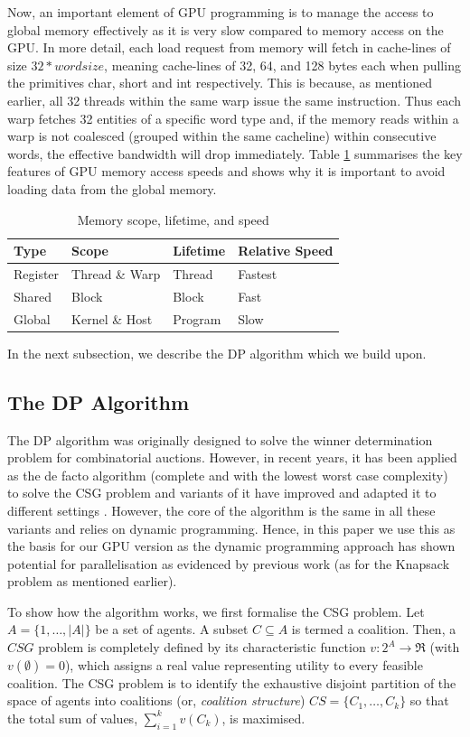 \documentclass{llncs}
\begin{document}
Now, an important element of GPU programming is to manage the access to global memory effectively as it is very slow compared to memory access on the GPU. In more detail,  each load request from memory will fetch in cache-lines of size $32*wordsize$, meaning cache-lines of 32, 64, and 128 bytes each when pulling the primitives char, short and int respectively. This is because, as mentioned earlier, all 32 threads within the same warp issue the same instruction.  Thus each warp fetches 32 entities of a specific word type and, if the memory reads within a warp is not coalesced (grouped within the same cacheline) within consecutive words, the effective bandwidth will drop immediately. Table \ref{mem} summarises the key features of GPU memory access speeds and shows why it is important to avoid loading data from the global memory.

\begin{table}
\centering
\caption{Memory scope, lifetime, and speed \label{mem}}
\begin{tabular}{|l|l|l|l|} \hline
Type&Scope&Lifetime&Relative Speed \\ \hline
Register&Thread \& Warp&Thread&Fastest\\
Shared&Block&Block&Fast\\
Global&Kernel \& Host&Program&Slow\\
\hline\end{tabular}
\end{table}
In the next subsection, we describe the DP algorithm which we build upon.
\subsection{The {DP} Algorithm} 
The DP algorithm \cite{DPalgorithm} was originally designed to solve the winner determination problem for combinatorial auctions. However, in recent years, it has been applied as the de facto  algorithm (complete and with the lowest worst case complexity) to solve the CSG problem and variants of it have improved and adapted it to different settings \cite{DBLP:conf/atal/RahwanJ08,DBLP:conf/aamas/VoiceRJ12}. However, the core of the algorithm is the same in all these variants and relies on dynamic programming. Hence, in this paper we use this as the basis for our GPU version as the dynamic programming approach has shown potential for parallelisation as evidenced by previous work (as for the Knapsack problem as mentioned earlier). 

To show how the algorithm works, we first formalise the CSG problem.  Let $A=\{1,\ldots,\vert A \vert \}$ be a set of agents. A subset $C \subseteq A$ is termed a coalition.  Then, a $CSG$ problem is completely defined by its characteristic function $v: 2^{A} \rightarrow \Re$ (with $v(\emptyset)=0$), which assigns a real value representing utility to every feasible coalition.  The CSG problem is to identify the exhaustive disjoint partition of the space of agents into coalitions (or, \emph{coalition structure})  $CS=\{C_1,\ldots,C_k\}$ so that the total sum of values, $\sum^k_{i=1} v(C_k)$,
is maximised.
\end{document}
